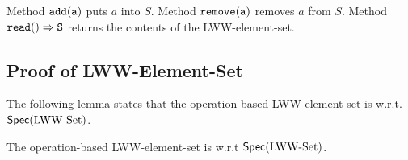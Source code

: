 Method $\alabelshort[{\tt add}]{a}$ puts $a$ into $S$. Method $\alabelshort[{\tt remove}]{a}$ removes $a$ from $S$. Method $\alabellong[{\tt read}]{}{S}{}$ returns the contents of the LWW-element-set.



\subsection{Proof of LWW-Element-Set}
\label{subsec:proof of LWW-element-set}

The following lemma states that the operation-based LWW-element-set is \crdtlinearizable{} w.r.t. $\mathsf{Spec}(\text{LWW\text{-}Set})$.

\begin{lemma}
\label{lemma:operation-based LWW-element-set is correct}
The operation-based LWW-element-set is \crdtlinearizable{} w.r.t $\mathsf{Spec}(\text{LWW\text{-}Set})$.
\end{lemma}

